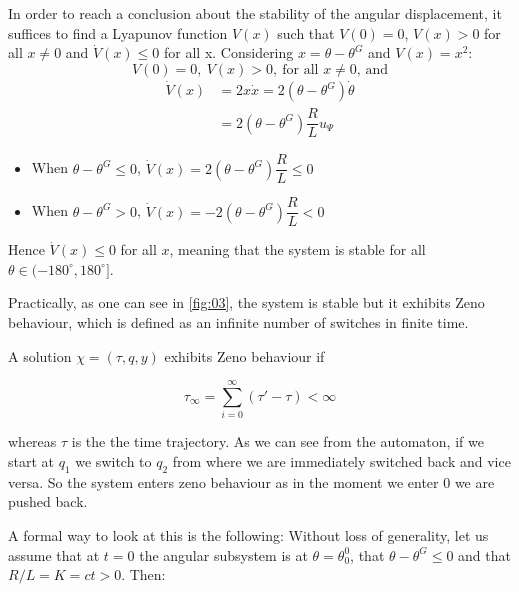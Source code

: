 In order to reach a conclusion about the stability of the angular displacement,
it suffices to find a Lyapunov function $V(x)$ such that $V(0) = 0$, $V(x) > 0$
for all $x \neq 0$ and $\dot{V}(x) \leq 0$ for all x. Considering
$x = \theta - \theta^G$ and $V(x) = x^2$:
$$V(0) = 0,\ V(x) > 0,\ \text{for all } x \neq 0\text{, and}$$
\begin{align*}
  \dot{V}(x) &= 2 x \dot{x} = 2 (\theta - \theta^G) \dot{\theta}  \\
             &= 2 (\theta - \theta^G) \dfrac{R}{L} u_{\Psi}
\end{align*}

\begin{itemize}
  \item When $\theta - \theta^G \leq 0$, $\dot{V}(x) = 2 (\theta - \theta^G) \dfrac{R}{L} \leq 0$
  \item When $\theta - \theta^G > 0$, $\dot{V}(x) = -2 (\theta - \theta^G) \dfrac{R}{L} < 0$
\end{itemize}

Hence $\dot{V}(x) \leq 0$ for all $x$, meaning that the system is stable for all
$\theta \in (-180^{\circ}, 180^{\circ}]$.

Practically, as one can see in \ref{fig:03}, the system is stable but it exhibits
Zeno behaviour, which is defined as an infinite number of switches in finite
time.

A solution $\chi=(\tau,q,y)$ exhibits Zeno behaviour if

\begin{equation}
  \tau_\infty= \sum_{i=0}^\infty (\tau'-\tau)<\infty
  \label{eq:03.zeno}
\end{equation}

whereas $\tau$ is the the time trajectory. As we can see from the automaton, if
we start at $q_1$ we switch to $q_2$ from where we are immediately switched back
and vice versa. So the system enters zeno behaviour as in the moment we enter 0 we
are pushed back.

\begin{figure}[H]\centering
  \scalebox{1.4}{}
  \caption{}
  \label{fig:03_automaton}
\end{figure}

A formal way to look at this is the following: Without loss of generality,
let us assume that at $t=0$ the angular subsystem is at $\theta = \theta_0^0$,
that $\theta - \theta^G \leq 0$ and that $R/L = K = ct > 0$. Then:

